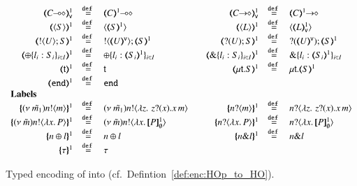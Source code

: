 \begin{figure}[h!]
\[\begin{array}{rclcrcl}
		\tmap{\lhot{C}}{1}_\mathsf{v}	&\defeq& \lhot{\tmap{C}{1}}
		& & 
		\tmap{\shot{C}}{1}_\mathsf{v}	&\defeq& \shot{\tmap{C}{1}}
		\\
		\tmap{\chtype{S}}{1}		&\defeq& \chtype{\tmap{S}{1}}
		& &
		\tmap{\chtype{L}}{1}		&\defeq& \chtype{\tmap{L}{1}_\mathsf{v}}
		\\
		\tmap{\btout{U} S}{1}		&\defeq& \btout{\tmap{U}{\mathsf{v}}} \tmap{S}{1}
		& &
		\tmap{\btinp{U} S}{1}		&\defeq& \btinp{\tmap{U}{\mathsf{v}}} \tmap{S}{1}
		\\
		\tmap{\btsel{l_i: S_i}_{i \in I}}{1} &\defeq& \btsel{l_i: \tmap{S_i}{1}}_{i \in I}
		& &
		\tmap{\btbra{l_i: S_i}_{i \in I}}{1} &\defeq& \btbra{l_i: \tmap{S_i}{1}}_{i \in I}
		\\
		\tmap{\vart{t}}{1} &\defeq& \vart{t}
		& &
		\tmap{\trec{t}{S}}{1} &\defeq& \trec{t}{\tmap{S}{1}}
		\\
		\tmap{\tinact}{1} &\defeq& \tinact
		\\
		\multicolumn{7}{l}{\textrm{\bf Labels}}
		\\
		\mapa{\news{\tilde{m_1}}\bactout{n}{m}}^{1}	&\defeq&	\news{\tilde{m_1}}\bactout{n}{\abs{z}{\,\binp{z}{x} \appl{x}{m}} }
		& &
		\mapa{\bactinp{n}{m}}^{1}			&\defeq&	\bactinp{n}{\abs{z}{\,\binp{z}{x} \appl{x}{m}} }
		\\
		\mapa{\news{\tilde{m}}\bactout{n}{\abs{x}{P}}}^{1} &\defeq& \news{\tilde{m}}\bactout{n}{\abs{x}{\pmapp{P}{1}{\es}}}
		& &
		\mapa{\bactinp{n}{\abs{x}{P}}}^{1} &\defeq& \bactinp{n}{\abs{x}{\pmapp{P}{1}{\es}}}
		\\
		\mapa{\bactsel{n}{l} }^{1} &\defeq& \bactsel{n}{l} 
		& &
		\mapa{\bactbra{n}{l} }^{1} &\defeq& \bactbra{n}{l} 
		\\
		\mapa{\tau}^{1} &\defeq& \tau

	\end{array}
\]
	\caption{
		\label{fig:enc:HOp_to_HO}
		Typed encoding of \HOp into \HO (cf.~Defintion~\ref{def:enc:HOp_to_HO}).
	}
\end{figure}

